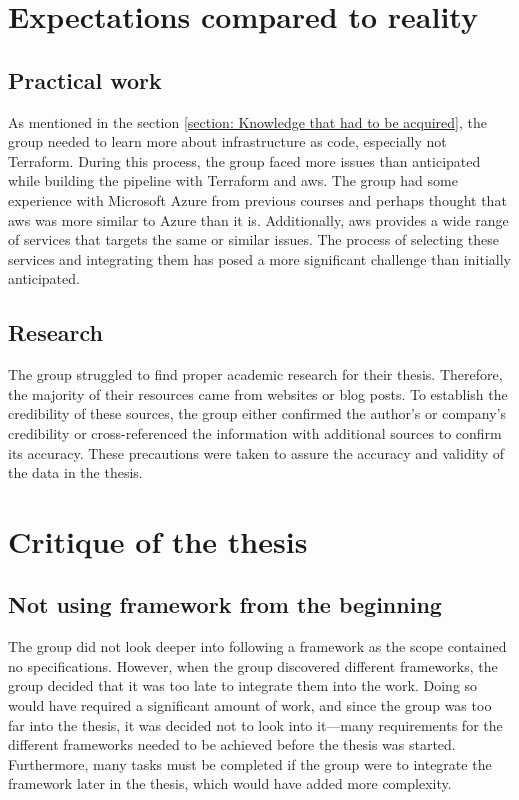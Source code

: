 \section{Expectations compared to reality}
\subsection{Practical work}
As mentioned in the section \ref{section: Knowledge that had to be acquired}, the group needed to learn more about  \gls{infrastructure as code}, especially not Terraform. During this process, the group faced more issues than anticipated while building the pipeline with Terraform and \acrshort{aws}. The group had some experience with Microsoft Azure from previous courses and perhaps thought that \acrshort{aws} was more similar to Azure than it is. Additionally, \acrshort{aws} provides a wide range of services that targets the same or similar issues. The process of selecting these services and integrating them has posed a more significant challenge than initially anticipated. 

\subsection{Research}
The group struggled to find proper academic research for their thesis. Therefore, the majority of their resources came from websites or blog posts. To establish the credibility of these sources, the group either confirmed the author's or company's credibility or cross-referenced the information with additional sources to confirm its accuracy. These precautions were taken to assure the accuracy and validity of the data in the thesis.


\section{Critique of the thesis}

\subsection{Not using framework from the beginning}
The group did not look deeper into following a framework as the scope contained no specifications. However, when the group discovered different frameworks, the group decided that it was too late to integrate them into the work. Doing so would have required a significant amount of work, and since the group was too far into the thesis, it was decided not to look into it—many requirements for the different frameworks needed to be achieved before the thesis was started. Furthermore, many tasks must be completed if the group were to integrate the framework later in the thesis, which would have added more complexity. 

